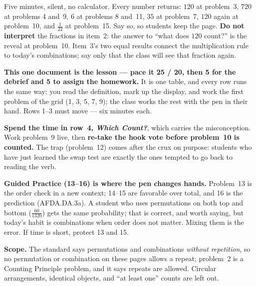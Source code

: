 \documentclass[10pt]{article}
\begin{document}
\begin{teachernote}[Warm-Up]
Five minutes, silent, no calculator. Every number returns: $120$ at problem~3, $720$ at problems 4
and~9, $6$ at problems 8 and~11, $35$ at problem~7, $120$ again at problem~10, and $\frac{1}{22}$
at problem~15. Say so, so students keep the page. \textbf{Do not interpret} the fractions in
item~2: the answer to ``what does $120$ count?'' is the reveal at problem~10. Item~3's two equal
results connect the multiplication rule to today's combinations; say only that the class
will see that fraction again.
\end{teachernote}

\begin{teachernote}
\textbf{This one document is the lesson --- pace it 25 / 20, then 5 for the debrief and 5 to
assign the homework.} It is one table, and every row runs the same way: you read the
definition, mark up the display, and work the first problem of the grid (1, 3, 5, 7, 9); the
class works the rest with the pen in their hand. Rows 1--3 must move --- six minutes each.

\textbf{Spend the time in row~4, \emph{Which Count?}}, which carries the misconception.
Work problem~9 live, then \textbf{re-take the hook vote before problem~10 is counted.} The trap
(problem~12) comes after the crux on purpose: students who have just learned the swap test are
exactly the ones tempted to go back to reading the verb.

\textbf{Guided Practice (13--16) is where the pen changes hands.} Problem~13 is the order check
in a new context; 14--15 are favorable over total, and 16 is the prediction (AFDA.DA.3a). A
student who uses permutations on both top and bottom ($\frac{60}{1320}$) gets the same
probability; that is correct, and worth saying, but today's habit is combinations when order
does not matter. Mixing them is the error. If time is short, protect 13 and 15.

\textbf{Scope.} The standard says permutations and combinations \emph{without repetition}, so
no permutation or combination on these pages allows a repeat; problem~2 is a Counting Principle
problem, and it says repeats are allowed. Circular arrangements, identical objects, and ``at
least one'' counts are left out.
\end{teachernote}
\end{document}
